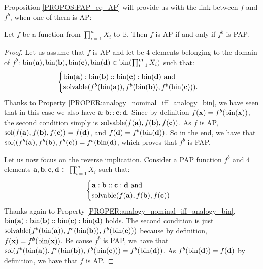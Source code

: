 Proposition \ref{PROPOS:PAP_eq_AP} will provide us with the link between $f$
and $f^b$, when one of them is AP:

\begin{proposition}
  \label{PROPOS:PAP_eq_AP}
Let $f$ be a function from $\prod_{i=1}^n X_i$ to $\mathbb{B}$. Then $f$ is AP
if and only if $f^b$ is PAP.
\end{proposition}
\begin{proof}
  Let us assume that $f$ is AP and let be 4 elements belonging to the domain of
  $f^b$: $\text{bin}(\mathbf{a}),\text{bin}(\mathbf{b}), \text{bin}(\mathbf{c}), \text{bin}(\mathbf{d})
  \in \text{bin}(\prod_{i=1}^m X_i)$ such that:
  $$\begin{cases}
    \text{bin}(\mathbf{a}):\text{bin}(\mathbf{b})::\text{bin}(\mathbf{c}):\text{bin}(\mathbf{d}) \mbox{
      and}\\
    \text{solvable}(f^b(\text{bin}(\mathbf{a})),f^b(\text{bin}(\mathbf{b})),f^b(\text{bin}(\mathbf{c}))).
  \end{cases}
  $$
Thanks to Property \ref{PROPER:analogy_nominal_iff_analogy_bin}, we have seen
  that in this case we also have
  $\mathbf{a}:\mathbf{b}::\mathbf{c}:\mathbf{d}$.  Since by definition
  $f(\mathbf{x}) = f^b(\text{bin}(\mathbf{x}))$,  the second condition simply is
  $\text{solvable}(f(\mathbf{a}),f(\mathbf{b}),f(\mathbf{c}))$. As $f$ is AP,
  $\text{sol}(f(\mathbf{a}),f(\mathbf{b}),f(\mathbf{c}))= f(\mathbf{d})$, and
  $f(\mathbf{d}) = f^b(\text{bin}(\mathbf{d}))$. So in the end, we have that
  $\text{sol}((f^b(\mathbf{a}),f^b(\mathbf{b}),f^b(\mathbf{c})) =
  f^b(\text{bin}(\mathbf{d})$, which proves that $f^b$ is PAP.

  Let us now focus on the reverse implication. Consider a PAP function
  $f^b$ and 4 elements $\mathbf{a}, \mathbf{b}, \mathbf{c}, \mathbf{d} \in
  \prod_{i=1}^m X_i$ such that:
  $$
  \begin{cases}
  \mathbf{a}:\mathbf{b}::\mathbf{c}:\mathbf{d} \mbox{ and}\\
  \text{solvable}(f(\mathbf{a}),f(\mathbf{b}),f(\mathbf{c}))
  \end{cases}
  $$
  Thanks again to Property \ref{PROPER:analogy_nominal_iff_analogy_bin},
  $\text{bin}(\mathbf{a}):\text{bin}(\mathbf{b})::\text{bin}(\mathbf{c}):\text{bin}(\mathbf{d})$ holds. 
  The second condition is just
  $\text{solvable}(f^b(\text{bin}(\mathbf{a})),f^b(\text{bin}(\mathbf{b})),f^b(\text{bin}(\mathbf{c})))$
  because by definition, $f(\mathbf{x}) = f^b(\text{bin}(\mathbf{x}))$. Be cause
  $f^b$ is PAP, we have that
  $\text{sol}(f^b(\text{bin}(\mathbf{a})),f^b(\text{bin}(\mathbf{b})),f^b(\text{bin}(\mathbf{c}))) =
  f^b(\text{bin}(\mathbf{d}))$. As $f^b(\text{bin}(\mathbf{d}))=f(\mathbf{d})$ by
  definition, we have that $f$ is AP.
\end{proof}

